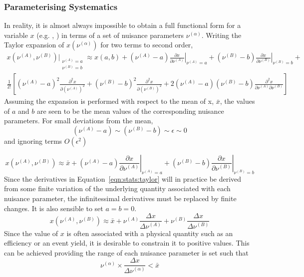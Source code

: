 \subsubsection{Parameterising Systematics}
In reality, it is almost always impossible to obtain a full functional form for
a variable $x$ (e.g. \RCSi, \NControli) in terms of a set of nuisance parameters
$\nu^{(\alpha)}$. Writing the Taylor expansion of $x(\nu^{(\alpha)})$ for two terms to
second order,
\begin{align*}
 x(\nu^{(A)}, \nu^{(B)})\bigg|_{\substack{\nu^{(A)} = a\\ \nu^{(B)} = b}} \approx
x(a,b) +
(\nu^{(A)} - a)\left.\frac{\partial x}{\partial\nu^{(A)}}\right|_{\nu^{(A)}=a} +
(\nu^{(B)} - b)\left.\frac{\partial x}{\partial\nu^{(B)}}\right|_{\nu^{(B)}=b} +\\
\frac{1}{2!}\left[
(\nu^{(A)} - a)^2 \frac{\partial^2 x}{\partial \left(\nu^{(A)}\right)^2}
+ (\nu^{(B)} - b)^2 \frac{\partial^2 x}{\partial \left(\nu^{(B)}\right)^2}
+ 2(\nu^{(A)} - a)(\nu^{(B)} - b)\frac{\partial^2 x}{\partial
  \nu^{(A)}\partial\nu^{(B)}}
\right]
\end{align*}
Assuming the expansion is performed with respect to the mean of x, $\bar{x}$,
the values of $a$ and $b$ are seen to be the mean values of the corresponding nuisance
parameters. For small deviations from the mean,
\begin{equation}
 (\nu^{(A)} - a) \sim (\nu^{(B)} - b) \sim \epsilon \sim 0
\end{equation}
and ignoring terms $O(\epsilon^2)$

\begin{equation}
x(\nu^{(A)}, \nu^{(B)}) \approx \bar{x} +
(\nu^{(A)} - a)\left.\frac{\partial x}{\partial\nu^{(A)}}\right|_{\nu^{(A)}=a} +
(\nu^{(B)} - b)\left.\frac{\partial x}{\partial\nu^{(B)}}\right|_{\nu^{(B)}=b}
\label{eqn:stats:taylor}
\end{equation}
Since the derivatives in Equation~\ref{eqn:stats:taylor} will in practice be
derived from some finite variation of the underlying quantity associated with
each nuisance parameter, the infinitessimal derivatives must be replaced by
finite changes. It is also sensible to set $a=b=0$.
\begin{equation}
x(\nu^{(A)}, \nu^{(B)}) \approx \bar{x} +
\nu^{(A)}\frac{\Delta x}{\Delta\nu^{(A)}} +
\nu^{(B)}\frac{\Delta x}{\Delta\nu^{(B)}}
\label{eqn:stats:taylor2}
\end{equation}
Since the value of $x$ is often associated with a physical quantity such as an
efficiency or an event yield, it is desirable to constrain it to positive
values. This can be achieved providing the range of each nuisance parameter is
set such that
\begin{equation}
\nu^{(\alpha)}\times\frac{\Delta x}{\Delta \nu^{(\alpha)}} < \bar{x}
\end{equation}

